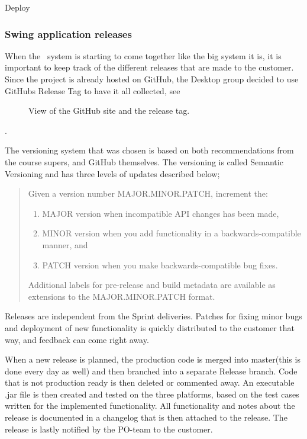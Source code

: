{\huge Deploy}
\subsubsection{Swing application releases}
When the \appName\ system is starting to come together like the big system it is, it is important to keep track of the different releases that are made to the customer. Since the project is already hosted on GitHub, the Desktop group decided to use GitHubs Release Tag to have it all collected, see 
\begin{figure}[htb]
	\caption{View of the GitHub site and the release tag.}
	\label{fig:des_gith-rel}
\end{figure}
\cite{des_rel-github}.

The versioning system that was chosen is based on both recommendations from the course supers, and GitHub themselves. The versioning is called Semantic Versioning\cite{des_semver} and has three levels of updates described below;

\begin{quotation}
	Given a version number MAJOR.MINOR.PATCH, increment the:
	\begin{enumerate}
		\item MAJOR version when incompatible API changes has been made,
    	\item MINOR version when you add functionality in a backwards-compatible manner, and
    	\item PATCH version when you make backwards-compatible bug fixes.
	\end{enumerate}
	Additional labels for pre-release and build metadata are available as extensions to the MAJOR.MINOR.PATCH format.
\end{quotation}
Releases are independent from the Sprint deliveries. Patches for fixing minor bugs and deployment of new functionality is quickly distributed to the customer that way, and feedback can come right away. 

When a new release is planned, the production code is merged into master(this is done every day as well) and then branched into a separate Release branch. Code that is not production ready is then deleted or commented away. An executable .jar file is then created and tested on the three platforms, based on the test cases written for the implemented functionality. All functionality and notes about the release is documented in a changelog that is then attached to the release. The release is lastly notified by the PO-team to the customer. 

